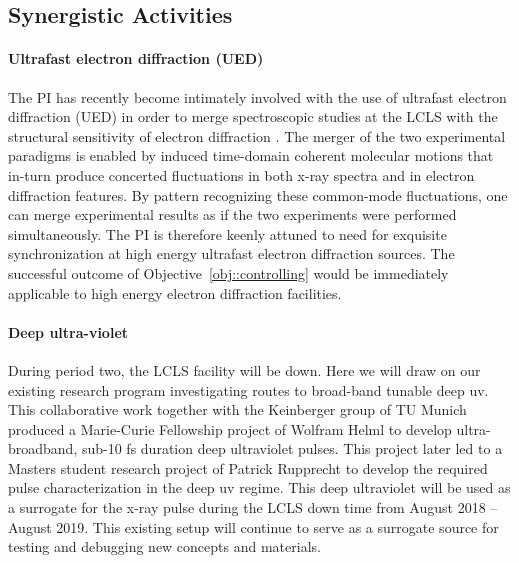 \subsection*{Synergistic Activities}

\paragraph*{Ultrafast electron diffraction (UED)}
The PI has recently become intimately involved with the use of ultrafast electron diffraction (UED) in order to merge spectroscopic studies at the LCLS with the structural sensitivity of electron diffraction \cite{ued_rsi2015,Jie2016}.
The merger of the two experimental paradigms is enabled by induced time-domain coherent molecular motions that in-turn produce concerted fluctuations in both x-ray spectra and in electron diffraction features.
By pattern recognizing these common-mode fluctuations, one can merge experimental results as if the two experiments were performed simultaneously.
The PI is therefore keenly attuned to need for exquisite synchronization at high energy ultrafast electron diffraction sources.
The successful outcome of Objective~\ref{obj::controlling} would be immediately applicable to high energy electron diffraction facilities.%


\paragraph*{Deep ultra-violet}
During period two, the LCLS facility will be down.
Here we will draw on our existing research program investigating routes to broad-band tunable deep uv.
This collaborative work together with the Keinberger group of TU Munich produced a Marie-Curie Fellowship project of Wolfram Helml to develop ultra-broadband, sub-10 fs duration deep ultraviolet pulses.
This project later led to a Masters student research project of Patrick Rupprecht to develop the required pulse characterization in the deep uv regime.
This deep ultraviolet will be used as a surrogate for the x-ray pulse during the LCLS down time from August 2018 -- August 2019.
This existing setup will continue to serve as a surrogate source for testing and debugging new concepts and materials. 

